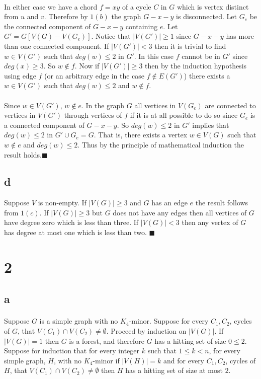 \documentclass[letterpaper,12pt,oneside,onecolumn]{report}
\begin{document}
\paragraph{}
In either case we have a chord $f=xy$ of a cycle $C$ in $G$ which is vertex distinct from $u$ and $v$. Therefore by $1(b)$ the graph $G - x - y$ is disconnected. Let $G_e$ be the connected component of $G-x-y$ containing $e$. Let $G' = G[V(G) - V(G_e)]$. Notice that $|V(G')| \geq 1$ since $G - x- y$ has more than one connected component. If $|V(G')| < 3$ then it is trivial to find $w \in V(G')$ such that $deg(w) \leq 2$ in $G'$. In this case $f$ cannot be in $G'$ since $deg(x) \geq 3$. So $w \not \in f$. Now if $|V(G')| \geq 3$ then by the induction hypothesis using edge $f$ (or an arbitrary edge in the case $f \not \in E(G')$) there exists a $w \in V(G')$ such that $deg(w) \leq 2$ and $w \not \in f$.
\paragraph{}
Since $w \in V(G')$, $w \not \in e$. In the graph $G$ all vertices in $V(G_e)$ are connected to vertices in $V(G')$ through vertices of $f$ if it is at all possible to do so since $G_e$ is a connected component of $G - x - y$. So $deg(w) \leq 2$ in $G'$ implies that $deg(w) \leq 2$ in $G' \cup G_e = G$. That is, there exists a vertex $w \in V(G)$ such that $w \not\in e$ and $deg(w) \leq 2$. Thus by the principle of mathematical induction the result holds.$\blacksquare$
\subsection*{d}
Suppose $V$ is non-empty. If $|V(G)| \geq 3$ and $G$ has an edge $e$ the result follows from $1(c)$. If $|V(G)| \geq 3$ but $G$ does not have any edges then all vertices of $G$ have degree zero which is less than three. If $|V(G)| < 3$ then any vertex of $G$ has degree at most one which is less than two. $\blacksquare$
\section*{2}
\subsection*{a}
\paragraph{}
Suppose $G$ is a simple graph with no $K_4$-minor. Suppose for every $C_1, C_2$, cycles of $G$, that $V(C_1) \cap V(C_2) \neq \emptyset$. Proceed by induction on $|V(G)|$. If $|V(G)|=1$ then $G$ is a forest, and therefore $G$ has a hitting set of size $0 \leq 2$. Suppose for induction that for every integer $k$ such that $1 \leq k < n$, for every simple graph, $H$, with no $K_4$-minor if $|V(H)| = k$ and for every $C_1, C_2$, cycles of $H$, that $V(C_1) \cap V(C_2) \neq \emptyset$ then $H$ has a hitting set of size at most $2$.
\end{document}
